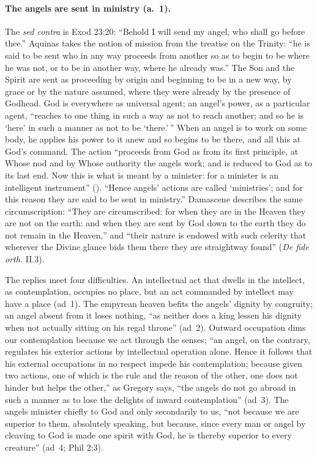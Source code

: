\paragraph{The angels are sent in ministry (a.~1).} The \emph{sed contra}
is Exod 23:20: ``Behold I will send my angel, who shall go before thee.''
Aquinas takes the notion of mission from the treatise on the Trinity: ``he
is said to be sent who in any way proceeds from another so as to begin to
be where he was not, or to be in another way, where he already was.'' The
Son and the Spirit are sent as proceeding by origin and beginning to be in
a new way, by grace or by the nature assumed, where they were already by
the presence of Godhead. God is everywhere as universal agent; an angel's
power, as a particular agent, ``reaches to one thing in such a way as not to
reach another; and so he is `here' in such a manner as not to be `there.'\,''
When an angel is to work on some body, he applies his power to it anew and
so begins to be there, and all this at God's command. The action ``proceeds
from God as from its first principle, at Whose nod and by Whose authority
the angels work; and is reduced to God as to its last end. Now this is what
is meant by a minister: for a minister is an intelligent instrument''
(). ``Hence angels'
actions are called `ministries'; and for this reason they are said to be
sent in ministry.'' Damascene describes the same circumscription: ``They are
circumscribed: for when they are in the Heaven they are not on the earth:
and when they are sent by God down to the earth they do not remain in the
Heaven,'' and ``their nature is endowed with such celerity that wherever
the Divine glance bids them there they are straightway found'' (\emph{De
fide orth.} II.3).

The replies meet four difficulties. An intellectual act that dwells in the
intellect, as contemplation, occupies no place, but an act commanded by
intellect may have a place (ad~1). The empyrean heaven befits the angels'
dignity by congruity; an angel absent from it loses nothing, ``as neither
does a king lessen his dignity when not actually sitting on his regal
throne'' (ad~2). Outward occupation dims our contemplation because we act
through the senses; ``an angel, on the contrary, regulates his exterior
actions by intellectual operation alone. Hence it follows that his external
occupations in no respect impede his contemplation; because given two
actions, one of which is the rule and the reason of the other, one does not
hinder but helps the other,'' as Gregory says, ``the angels do not go abroad
in such a manner as to lose the delights of inward contemplation'' (ad~3).
The angels minister chiefly to God and only secondarily to us, ``not
because we are superior to them, absolutely speaking, but because, since
every man or angel by cleaving to God is made one spirit with God, he is
thereby superior to every creature'' (ad~4; Phil 2:3).

